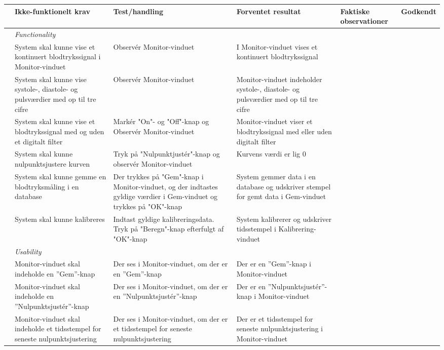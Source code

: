 \begin{longtabu} to 
	& Ikke-funktionelt krav & Test/handling & Forventet resultat & Faktiske observationer & Godkendt
	\\[-1ex] \midrule
	&  \textit{Functionality} &  &  & & \\ \midrule
	& System skal kunne vise et kontinuert blodtrykssignal i Monitor-vinduet & Observér Monitor-vinduet & I Monitor-vinduet vises et kontinuert blodtrykssignal &  & %
	\\ \midrule
	& System skal kunne vise systole-, diastole- og pulsværdier med op til tre cifre & Observér Monitor-vinduet & Monitor-vinduet indeholder systole-, diastole- og pulsværdier med op til tre cifre &  & %
	\\ \midrule
	& System skal kunne vise et blodtrykssignal med og uden et digitalt filter & Markér "On"- og "Off"\--knap og Observér Monitor-vinduet & Monitor-vinduet viser et blodtrykssignal med eller uden digitalt filter &  & %
	\\ \midrule
	& System skal kunne nulpunktsjustere kurven & Tryk på "Nulpunktjustér"\--knap og observér Monitor-vinduet & Kurvens værdi er lig 0 &  & %
	\\ \midrule
	& System skal kunne gemme en blodtryksmåling i en database & Der trykkes på "Gem"\--knap i Monitor-vinduet, og der indtastes gyldige værdier i Gem-vinduet og trykkes på "OK"\--knap & System gemmer data i en database og udskriver stempel for gemt data i Gem-vinduet &  & %
	\\ \midrule
	& System skal kunne kalibreres & Indtast gyldige kalibreringsdata. Tryk på "Beregn"\--knap efterfulgt af "OK"\--knap & System kalibrerer og udskriver tidsstempel i Kalibrering-vinduet &  & %
	\\ \midrule
	& \textit{Usability} &  &  & & \\ \midrule
	& Monitor-vinduet skal indeholde en ”Gem”\--knap & Der ses i Monitor-vinduet, om der er en ”Gem”\--knap & Der er en ”Gem”\--knap i Monitor-vinduet &  & %
	\\ \midrule
	& Monitor-vinduet skal indeholde en ”Nulpunktsjustér”\--knap & Der ses i Monitor-vinduet, om der er en ”Nulpunktsjustér”\--knap & Der er en ”Nulpunktsjustér”\--knap i Monitor-vinduet &  & %
	\\ \midrule 
	& Monitor-vinduet skal indeholde et tidsstempel for seneste nulpunktsjustering & Der ses i Monitor-vinduet, om der er et tidsstempel for seneste nulpunktsjustering & Der er et tidsstempel for seneste nulpunktsjustering i Monitor-vinduet & & %

\end{longtabu}
